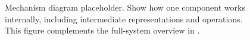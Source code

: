 \begin{figure}[!t]
  \centering
  \caption{Mechanism diagram placeholder. Show how one component works
  internally, including intermediate representations and operations.
  This figure complements the full-system overview in .}
  \label{fig:component}
\end{figure}
